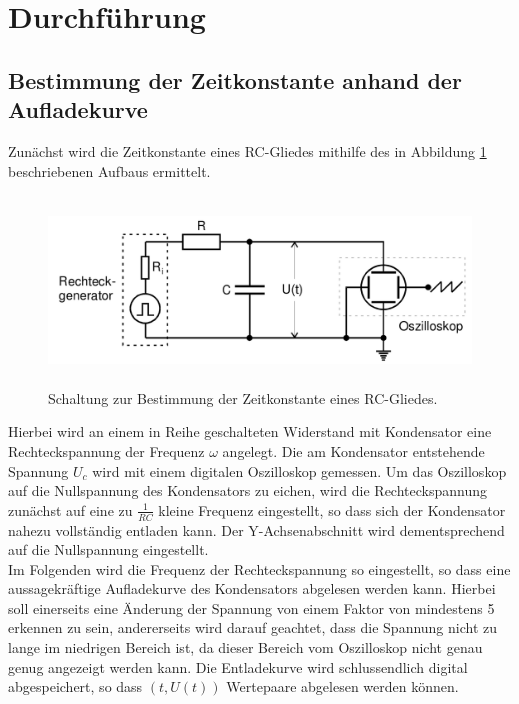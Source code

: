 \section{Durchführung}
\label{sec:Durchführung}
\subsection{Bestimmung der Zeitkonstante anhand der Aufladekurve}
Zunächst wird die Zeitkonstante eines RC-Gliedes mithilfe des in Abbildung \ref{fig:aufbau_a} beschriebenen Aufbaus ermittelt.
\begin{figure}[H]
  \centering
  \includegraphics[height=5cm]{aufbau_a.png}
  \caption{Schaltung zur Bestimmung der Zeitkonstante eines RC-Gliedes. \cite{sample}}
  \label{fig:aufbau_a}
\end{figure}
Hierbei wird an einem in Reihe geschalteten Widerstand mit Kondensator eine Rechteckspannung der Frequenz $\omega$ angelegt.
Die am Kondensator entstehende Spannung $U_c$ wird mit einem digitalen Oszilloskop gemessen.
Um das Oszilloskop auf die Nullspannung des Kondensators zu eichen, wird die Rechteckspannung zunächst auf eine zu $\frac{1}{RC}$ kleine Frequenz eingestellt, so dass sich der Kondensator nahezu vollständig entladen kann.
Der Y-Achsenabschnitt wird dementsprechend auf die Nullspannung eingestellt.\\
Im Folgenden wird die Frequenz der Rechteckspannung so eingestellt, so dass eine aussagekräftige Aufladekurve des Kondensators abgelesen werden kann.
Hierbei soll einerseits eine Änderung der Spannung von einem Faktor von mindestens 5 erkennen zu sein, andererseits wird darauf geachtet, dass die Spannung nicht zu lange im niedrigen Bereich ist, da dieser Bereich vom Oszilloskop nicht genau genug angezeigt werden kann.
Die Entladekurve wird schlussendlich digital abgespeichert, so dass $(t, U(t))$ Wertepaare abgelesen werden können.

